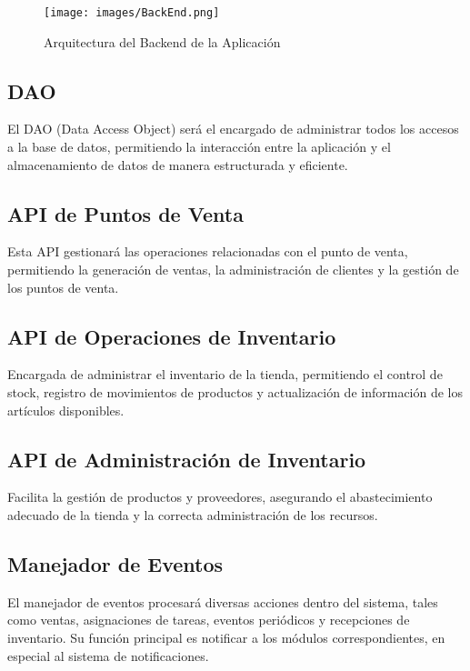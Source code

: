 \begin{figure}[H]
    \texttt{[image: images/BackEnd.png]}
    \centering
    \caption{Arquitectura del Backend de la Aplicación}
\end{figure}

\subsection{DAO}

El DAO (Data Access Object) será el encargado de administrar todos los accesos a la base de datos, permitiendo la interacción entre la aplicación y el almacenamiento de datos de manera estructurada y eficiente.

\subsection{API de Puntos de Venta}

Esta API gestionará las operaciones relacionadas con el punto de venta, permitiendo la generación de ventas, la administración de clientes y la gestión de los puntos de venta.

\subsection{API de Operaciones de Inventario}

Encargada de administrar el inventario de la tienda, permitiendo el control de stock, registro de movimientos de productos y actualización de información de los artículos disponibles.

\subsection{API de Administración de Inventario}

Facilita la gestión de productos y proveedores, asegurando el abastecimiento adecuado de la tienda y la correcta administración de los recursos.

\subsection{Manejador de Eventos}

El manejador de eventos procesará diversas acciones dentro del sistema, tales como ventas, asignaciones de tareas, eventos periódicos y recepciones de inventario. Su función principal es notificar a los módulos correspondientes, en especial al sistema de notificaciones.

